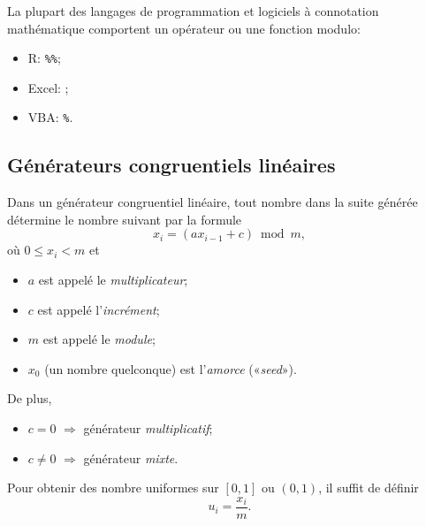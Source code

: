La plupart des langages de programmation et logiciels à connotation
mathématique comportent un opérateur ou une fonction modulo:
\begin{itemize}
\item R: \verb|%%|;
\item Excel: ;
\item VBA: \verb|%|.
\end{itemize}


\subsection{Générateurs congruentiels linéaires}

Dans un générateur congruentiel linéaire, tout nombre dans la suite
générée détermine le nombre suivant par la formule
\begin{displaymath}
  x_i = (a x_{i - 1} + c) \bmod m,
\end{displaymath}
où $0 \leq x_i < m$ et
\begin{itemize}
\item $a$ est appelé le \emph{multiplicateur};
\item $c$ est appelé l'\emph{incrément};
\item $m$ est appelé le \emph{module};
\item $x_0$ (un nombre quelconque) est l'\emph{amorce} («\emph{seed}»).
\end{itemize}
De plus,
\begin{itemize}
\item $c = 0$ $\Rightarrow$ générateur \emph{multiplicatif};
\item $c \neq 0$ $\Rightarrow$ générateur \emph{mixte}.
\end{itemize}

Pour obtenir des nombre uniformes sur $[0, 1]$ ou $(0, 1)$, il suffit
de définir
\begin{displaymath}
  u_i = \frac{x_i}{m}.
\end{displaymath}

